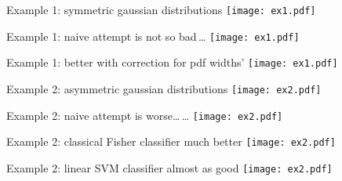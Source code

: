 \documentclass[handout]{beamer}   %
\begin{document}


\begin{frame}{Example 1: symmetric gaussian distributions}
  \texttt{[image: ex1.pdf]}
\end{frame}
\begin{frame}{Example 1: naive attempt is not so bad\,\dots}
  \texttt{[image: ex1.pdf]}
\end{frame}
\begin{frame}{Example 1: better with correction for pdf widths'}
  \texttt{[image: ex1.pdf]}
\end{frame}


\begin{frame}{Example 2: asymmetric gaussian distributions}
  \texttt{[image: ex2.pdf]}
\end{frame}
\begin{frame}{Example 2: naive attempt is worse\/\dots\,\dots}
  \texttt{[image: ex2.pdf]}
\end{frame}
\begin{frame}{Example 2: classical Fisher classifier much better}
  \texttt{[image: ex2.pdf]}
\end{frame}
\begin{frame}{Example 2: linear SVM classifier almost as good}
  \texttt{[image: ex2.pdf]}
\end{frame}
\end{document}
